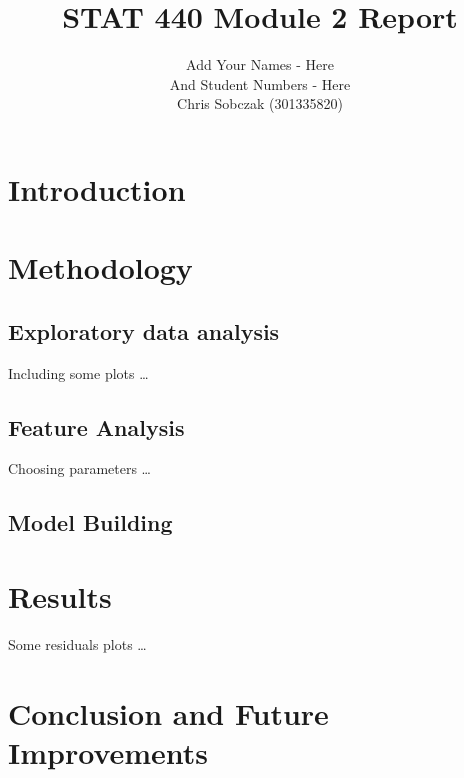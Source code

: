 \documentclass{article}
\author{
	Add Your Names - Here\\
	And Student Numbers - Here\\
	Chris Sobczak (301335820)
}
\title{STAT 440 Module 2 Report}
\begin{document}
\maketitle

\section{Introduction}

\section{Methodology}

\subsection{Exploratory data analysis}

Including some plots \dots

\subsection{Feature Analysis}

Choosing parameters \dots

\subsection{Model Building}

\section{Results}

Some residuals plots \dots

\section{Conclusion and Future Improvements}

\printbibliography
\end{document}
